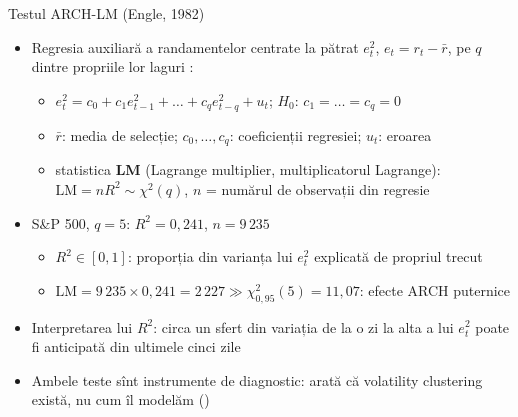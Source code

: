 \begin{frame}{Testul ARCH-LM (Engle, 1982)}
\itemsize{\small}
\begin{itemize}
    \item Regresia auxiliară a randamentelor centrate la pătrat $e_t^2$, $e_t = r_t - \bar r$, pe $q$ dintre propriile lor laguri :
    \begin{itemize}
        \item $e_t^2 = c_0 + c_1 e_{t-1}^2 + \dots + c_q e_{t-q}^2 + u_t$; $H_0$: $c_1 = \dots = c_q = 0$
        \item $\bar r$: media de selecție; $c_0, \dots, c_q$: coeficienții regresiei; $u_t$: eroarea
        \item statistica \textbf{LM} (Lagrange multiplier, multiplicatorul Lagrange): $\mathrm{LM} = n R^2 \sim \chi^2(q)$, $n$ = numărul de observații din regresie
    \end{itemize}
    \item S\&P 500, $q = 5$: $R^2 = 0{,}241$, $n = 9\,235$
    \begin{itemize}
        \item $R^2 \in [0, 1]$: proporția din varianța lui $e_t^2$ explicată de propriul trecut
        \item $\mathrm{LM} = 9\,235 \times 0{,}241 = 2\,227 \gg \chi^2_{0{,}95}(5) = 11{,}07$: efecte ARCH puternice
    \end{itemize}
    \item Interpretarea lui $R^2$: circa un sfert din variația de la o zi la alta a lui $e_t^2$ poate fi anticipată din ultimele cinci zile
    \item Ambele teste sînt instrumente de diagnostic: arată că volatility clustering există, nu cum îl modelăm ()
\end{itemize}
\end{frame}

